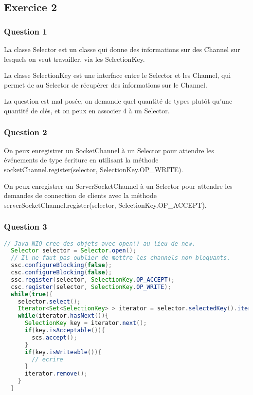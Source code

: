 \subsection{Exercice 2}

\subsubsection{Question 1}

La classe Selector est un classe qui donne des informations
sur des Channel sur lesquels on veut travailler, via
les SelectionKey.

La classe SelectionKey est une interface entre le Selector
et les Channel, qui permet de au Selector de
r\'ecup\'erer des informations sur le Channel.

La question est mal pos\'ee, on demande quel quantit\'e de
types plut\^ot qu'une quantit\'e de cl\'es, et on peux en
associer 4 \`a un Selector.

\subsubsection{Question 2}

On peux enregistrer un SocketChannel \`a un Selector pour
attendre les \'ev\'enements de type \'ecriture en utilisant
la m\'ethode\\socketChannel.register(selector,
SelectionKey.OP\_WRITE).

On peux enregistrer un ServerSocketChannel \`a un
Selector pour attendre les demandes de connection de clients
avec la m\'ethode\\
serverSocketChannel.register(selector,
SelectionKey.OP\_ACCEPT).

\subsubsection{Question 3}

\begin{lstlisting}[language=Java,caption={Selector
    qui attend des demandes de connection \`a un serveur
    et des demandes d'\'ecriture d'un client},captionpos=b]
  // Java NIO cree des objets avec open() au lieu de new.
  Selector selector = Selector.open();
  // Il ne faut pas oublier de mettre les channels non bloquants.
  ssc.configureBlocking(false);
  csc.configureBlocking(false);
  ssc.register(selector, SelectionKey.OP_ACCEPT);
  csc.register(selector, SelectionKey.OP_WRITE);
  while(true){
    selector.select();
    Iterator<Set<SelectionKey> > iterator = selector.selectedKey().iterator();
    while(iterator.hasNext()){
      SelectionKey key = iterator.next();
      if(key.isAcceptable()){
        scs.accept();
      }
      if(key.isWriteable()){
        // ecrire
      }
      iterator.remove();
    }
  }
\end{lstlisting}

